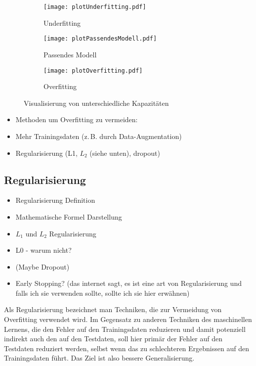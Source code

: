 \begin{figure}[h]
    \centering
	
	\begin{subfigure}[t]{0.6\textwidth}
		\texttt{[image: plotUnderfitting.pdf]}
		\caption{Underfitting}
		\label{subfig:underfitting}
	\end{subfigure}
	\begin{subfigure}[t]{0.6\textwidth}
		\texttt{[image: plotPassendesModell.pdf]}
		\caption{Passendes Modell}
		\label{subfig:rightfitting}
	\end{subfigure}
	\begin{subfigure}[t]{0.6\textwidth}
        \texttt{[image: plotOverfitting.pdf]}
		\caption{Overfitting}
		\label{subfig:overfitting}
	\end{subfigure}
	\caption{Visualisierung von unterschiedliche Kapazitäten}
	\label{fig:capacity}
\end{figure}

\color{blue}
\begin{itemize}
	\item Methoden um Overfitting zu vermeiden:
	\item Mehr Trainingsdaten (z.\,B. durch Data-Augmentation)
	\item Regularisierung (L1, \(L_2\) (siehe unten), dropout)
\end{itemize}
\color{black}

\subsection{Regularisierung} \label{ssec:Regul}

\color{blue}
\begin{itemize}
	\item Regularisierung Definition
	\item Mathematische Formel Darstellung
	\item \(L_1\) und \(L_2\) Regularisierung
	\item L0 - warum nicht?
	\item (Maybe Dropout)
	\item Early Stopping? (das internet sagt, es ist eine art von Regularisierung und falls ich sie verwenden sollte, sollte ich sie hier erwähnen)
\end{itemize}
\color{black}

Als Regularisierung bezeichnet man Techniken, die zur Vermeidung von Overfitting verwendet wird.
Im Gegensatz zu anderen Techniken des maschinellen Lernens, die den Fehler auf den Trainingsdaten reduzieren und damit potenziell indirekt auch den auf den Testdaten,
soll hier primär der Fehler auf den Testdaten reduziert werden, selbst wenn das zu schlechteren Ergebnissen auf den Trainingsdaten führt.
Das Ziel ist also bessere Generalisierung.

